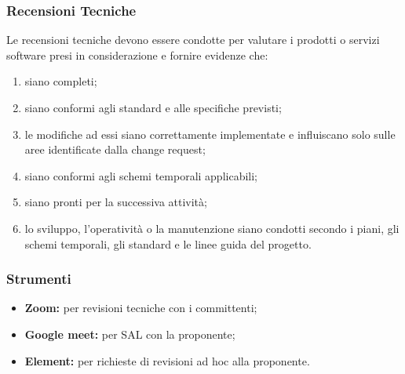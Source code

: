 \subsubsection{Recensioni Tecniche}
Le recensioni tecniche devono essere condotte per valutare i prodotti o servizi software presi in considerazione e fornire evidenze che: 

\begin{enumerate}
    \item
        siano completi; 
    \item
        siano conformi agli standard e alle specifiche previsti; 
    \item
        le modifiche ad essi siano correttamente implementate e influiscano solo sulle aree identificate dalla change request; 
    \item
        siano conformi agli schemi temporali applicabili; 
    \item
        siano pronti per la successiva attività; 
    \item
        lo sviluppo, l'operatività o la manutenzione siano condotti secondo i piani, gli schemi temporali, gli standard e le linee guida del progetto. 
\end{enumerate}

\subsubsection{Strumenti}

\begin{itemize}
    \item \textbf{Zoom:} 
        per revisioni tecniche con i committenti; 
    \item \textbf{Google meet:} 
        per SAL con la proponente; 
    \item \textbf{Element:} 
        per richieste di revisioni ad hoc alla proponente.
\end{itemize}